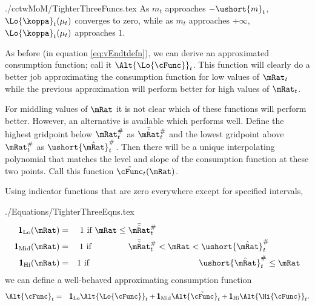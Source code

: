 \documentclass[titlepage]{\econtex}
\begin{document}
\begin{verbatimwrite}{./cctwMoM/TighterThreeFuncs.tex}
As $m_{t}$ approaches
$-\ushort{m}_{t}$, $\Lo{\koppa}_{t}(\mu_{t})$ converges to zero, while as $m_{t}$
approaches $+\infty$, $\Lo{\koppa}_{t}(\mu_{t})$ approaches $1$.  

As before (in equation \eqref{eq:vEndtdefn}), we can derive an approximated consumption function; call it
$\Alt{\Lo{\cFunc}}_{t}$.  This function will clearly do a better job approximating the consumption
function for low values of $\mRat_{t}$ while the previous approximation will perform better
for high values of $\mRat_{t}$.  

For middling values of $\mRat$ it is not clear which of these
functions will perform better.  However, an alternative is available
which performs well.  Define the highest gridpoint below $\mtCusp$ as
$\bar{\check{\mRat}}_{t}^{\#}$ and the lowest gridpoint above $\mtCusp$ as
$\ushort{\hat{\mRat}}_{t}^{\#}$.  Then there will be a unique interpolating
polynomial that matches the level and slope of the consumption function
at these two points.  Call this function $\tilde{\cFunc}_{t}(\mRat)$.  

Using indicator functions that are zero everywhere except for specified intervals,
\end{verbatimwrite}

\begin{verbatimwrite}{./Equations/TighterThreeEqns.tex}
\begin{eqnarray*}
    \pmb{1}_{\text{Lo}}(\mRat) & = & 1 \text{~if $          \mRat \leq  \bar{\check{\mRat}}_{t}^{\#} \phantom{< \mRat <   \ushort{\hat{\mRat}}_{t}^{\#}          \leq \mRat}$}
\\  \pmb{1}_{\text{Mid}}(\mRat) & = & 1 \text{~if $\phantom{ \mRat \leq}~ \bar{\check{\mRat}}_{t}^{\#}          < \mRat <   \ushort{\hat{\mRat}}_{t}^{\#} \phantom{\leq \mRat}$}
\\  \pmb{1}_{\text{Hi}}(\mRat) & = & 1 \text{~if $\phantom{ \mRat \leq  ~\bar{\check{\mRat}}_{t}^{\#}          < \mRat < } \ushort{\hat{\mRat}}_{t}^{\#}           \leq \mRat$}
\end{eqnarray*}
we can define a well-behaved approximating consumption function
\begin{eqnarray}
  \Alt{\cFunc}_{t} & = & \pmb{1}_{\text{Lo}} \Alt{\Lo{\cFunc}}_{t} + \pmb{1}_{\text{Mid}} \Alt{\tilde{\cFunc}}_{t}+\pmb{1}_{\text{Hi}} \Alt{\Hi{\cFunc}}_{t}.
\end{eqnarray}
\end{verbatimwrite}

\end{document}
